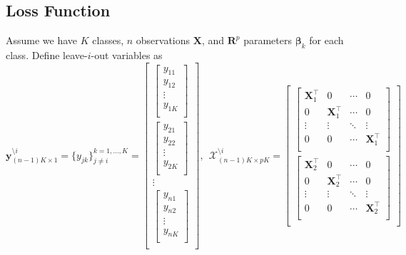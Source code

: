 \documentclass[11pt]{article}
\newcommand{\by}{\bm{y}}
\newcommand{\bX}{\bm{X}}
\begin{document}
\subsection{Loss Function}
Assume we have $K$ classes, $n$ observations $\bX$, and $\bm{R}^p$ parameters $\bm{\beta}_{k}$ for each class. Define leave-\(i\)-out variables as 
\[\by_{(n-1)K\times 1}^{\setminus i}=\{y_{jk}\}_{j\neq i}^{k=1,...,K}=
\begin{bmatrix}
\begin{bmatrix}
y_{11} \\
y_{12} \\
\vdots \\
y_{1K} \\
\end{bmatrix} \\
\begin{bmatrix}
y_{21} \\
y_{22} \\
\vdots \\
y_{2K} \\
\end{bmatrix} \\
\vdots \\
\begin{bmatrix}
y_{n1} \\
y_{n2} \\
\vdots \\
y_{nK} \\
\end{bmatrix} \\
\end{bmatrix},\ \ 
\bm{\mathcal{X}}_{(n-1)K\times pK}^{\setminus i}=\begin{bmatrix}
\begin{bmatrix}
\bX_1^\top & 0 & \cdots & 0 \\
0 & \bX_1^\top & \cdots & 0 \\
\vdots & \vdots & \ddots & \vdots \\
0 & 0 & \cdots & \bX_1^\top \\
\end{bmatrix} \\
\begin{bmatrix}
\bX_2^\top & 0 & \cdots & 0 \\
0 & \bX_2^\top & \cdots & 0 \\
\vdots & \vdots & \ddots & \vdots \\
0 & 0 & \cdots & \bX_2^\top \\
\end{bmatrix} \\

\end{bmatrix}\]
\end{document}
